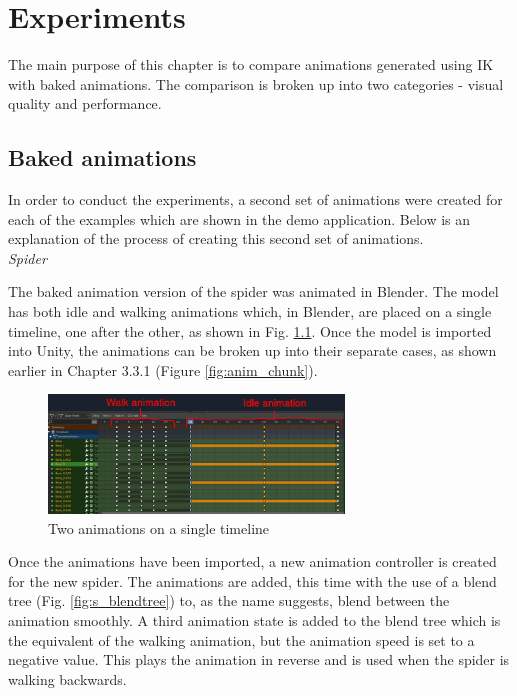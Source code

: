 \chapter{Experiments}
The main purpose of this chapter is to compare animations generated using IK
with baked animations. The comparison is broken up into two categories - visual
quality and performance. 

\section{Baked animations}
 In order to conduct the experiments, a second set of animations were created
 for each of the examples which are shown in the demo application. Below is an
 explanation of the process of creating this second set of animations. \\

\noindent\textit{Spider}

The baked animation version of the spider was animated in Blender. The model
has both idle and walking animations which, in Blender, are placed on
a single timeline, one after the other, as shown in Fig. \ref{fig:timeline}.
Once the model is imported into Unity, the animations can be broken up into
their separate cases, as shown earlier in Chapter 3.3.1 (Figure
\ref{fig:anim_chunk}). 

\begin{figure}[h!]
    \centering
    \includegraphics[width=0.7\textwidth]{grafika/blender_timeline.png}
    \caption{Two animations on a single timeline}
    \label{fig:timeline}
\end{figure}

Once the animations have been imported, a new animation controller is created
for the new spider. The animations are added, this time with the use of a blend
tree (Fig. \ref{fig:s_blendtree}) to, as the name suggests, blend between the
animation smoothly. A third animation state is added to the blend tree
which is the equivalent of the walking animation, but the animation speed is set
to a negative value. This plays the animation in reverse and is used when the
spider is walking backwards. 

